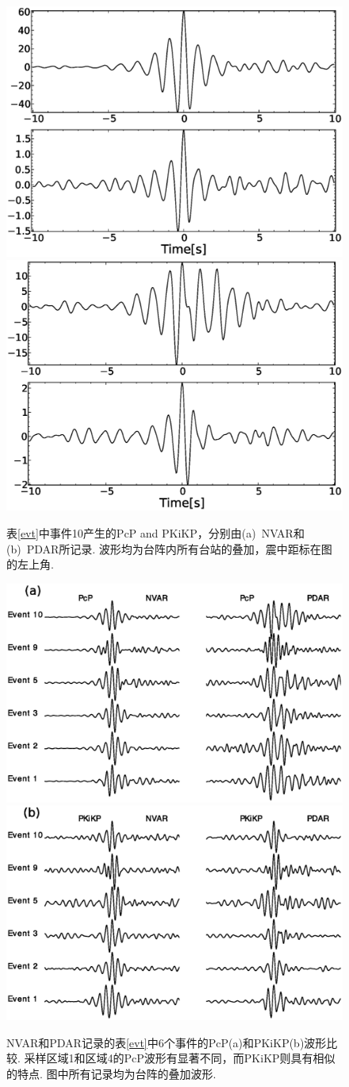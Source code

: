 \begin{figure}
\centering
\includegraphics[width=0.4\linewidth]{fig/chap3/amp_nv_4371355_s.eps}
\quad
\includegraphics[width=0.4\linewidth]{fig/chap3/amp_pd_4371355_s.eps}
\caption{表\ref{evt}中事件10产生的PcP and PKiKP，分别由(a)~NVAR和(b)~PDAR所记录. 波形均为台阵内所有台站的叠加，震中距标在图的左上角. }
\label{amp_nv_pd}
\end{figure}

\begin{figure}
\centering
\includegraphics[width=0.7\linewidth]{fig/chap3/pcp_nvpd.eps}
\\
\includegraphics[width=0.7\linewidth]{fig/chap3/pkikp_nvpd.eps}
\caption{NVAR和PDAR记录的表\ref{evt}中6个事件的PcP(a)和PKiKP(b)波形比较. 采样区域1和区域4的PcP波形有显著不同，而PKiKP则具有相似的特点. 图中所有记录均为台阵的叠加波形. }
\label{pcp_pkikp_nvpd}
\end{figure}

